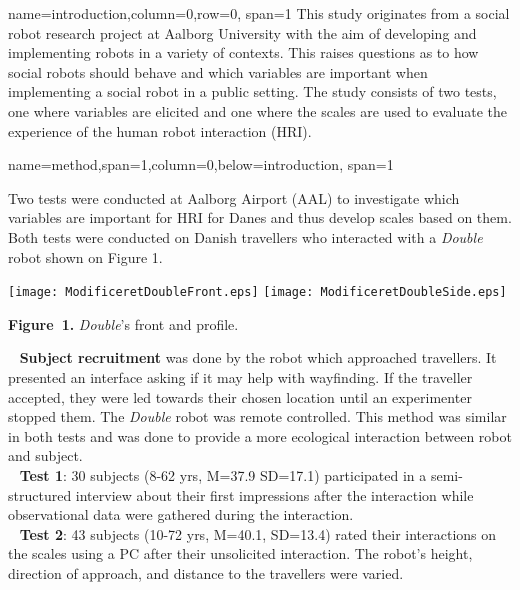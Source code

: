 \documentclass[paperwidth=118cm,paperheight=84cm,landscape,fontscale=0.2941]{baposter}
\begin{document}
\begin{poster}
{name=introduction,column=0,row=0, span=1}
{\parskip 5pt   
This study originates from a social robot research project at Aalborg University with the aim of developing and implementing robots in a variety of contexts. This raises questions as to how social robots should behave and which variables are important when implementing a social robot in a public setting. The study consists of two tests, one where variables are elicited and one where the scales are used to evaluate the experience of the human robot interaction (HRI). %
}

{name=method,span=1,column=0,below=introduction, span=1}
{\parskip 5pt 
Two tests were conducted at Aalborg Airport (AAL) to investigate which variables are important for HRI for Danes and thus develop scales based on them. Both tests were conducted on Danish travellers who interacted with a \textit{Double} robot shown on Figure 1.\\
\vspace{-11pt}  

\begin{center}
\texttt{[image: ModificeretDoubleFront.eps]}
\texttt{[image: ModificeretDoubleSide.eps]}

\textbf{Figure~1. }\footnotesize{\textit{Double}'s front and profile.}
\end{center}
\vspace{-10pt}  

\textbullet~ \textbf{Subject recruitment} was done by the robot which approached travellers. It presented an interface asking if it may help with wayfinding. If the traveller accepted, they were led towards their chosen location until an experimenter stopped them. The \textit{Double} robot was remote controlled. This method was similar in both tests and was done to provide a more ecological interaction between robot and subject.\\
\textbullet~ \textbf{Test 1}: 30 subjects (8-62 yrs, M=37.9 SD=17.1) participated in a semi-structured interview about their first impressions after the interaction while observational data were gathered during the interaction. \\
\textbullet~ \textbf{Test 2}: 43 subjects (10-72 yrs, M=40.1, SD=13.4) rated their interactions on the scales using a PC after their unsolicited interaction. The robot's height, direction of approach, and distance to the travellers were varied.

}
\end{poster}
\end{document}
